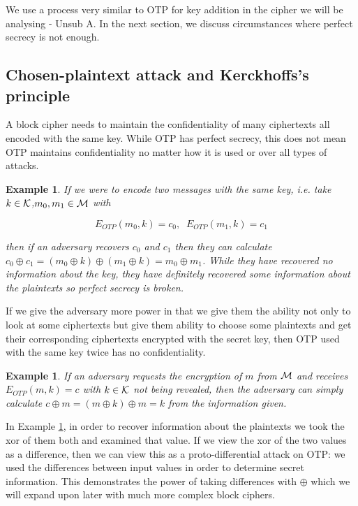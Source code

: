 \documentclass[12pt,a4paper]{article}
\newtheorem{example}[theorem]{Example}
\begin{document}
We use a process very similar to OTP for key addition in the cipher we will be
analysing - Unsub A. In the next section, we discuss
circumstances where perfect secrecy is not enough.

\subsection{Chosen-plaintext attack and Kerckhoffs's principle}

A block cipher needs to maintain the confidentiality of many ciphertexts all
encoded with the same key. While OTP has perfect secrecy, this does not mean
OTP maintains confidentiality no matter how it is used or over all types of
attacks. 

\begin{example}\label{exm:break_OTP}
If we were to encode two messages with the same key, i.e.
take $k \in {\cal{K}}$,$m_0,m_1 \in \cal{M}$ with

\[E_{OTP}(m_0,k) = c_0, \; \; E_{OTP}(m_1,k) = c_1\] 

then if an adversary recovers $c_0$ and $c_1$ then they can calculate $c_0 \oplus c_1 = (m_0 \oplus k) \oplus (m_1 \oplus k) = m_0
\oplus m_1$. While they have recovered no information about the key, they have
definitely recovered some information about the plaintexts so perfect
secrecy is broken. 
\end{example}

If we give the adversary more power in that we give them the ability not only to
look at some ciphertexts but give them ability to choose some plaintexts and
get their corresponding ciphertexts encrypted with the secret key, then OTP
used with the same key twice has no confidentiality.

\begin{example}If an adversary requests the encryption of $m$ from
$\cal{M}$ and receives $E_{OTP}(m,k) = c$ with $k \in \cal{K}$ not being revealed,
then the adversary can simply calculate $c \oplus m = (m \oplus k) \oplus m = k$
from the information given. 
\end{example}

In Example \ref{exm:break_OTP}, in order to recover information about the
plaintexts we took the xor of them both and examined that value. If we view the
xor of the two values as a difference, then we can view this as a
proto-differential attack on OTP: we used the differences between input values
in order to determine secret information. This demonstrates the power of taking
differences with $\oplus$ which we will expand upon later with much more
complex block ciphers.
\end{document}
